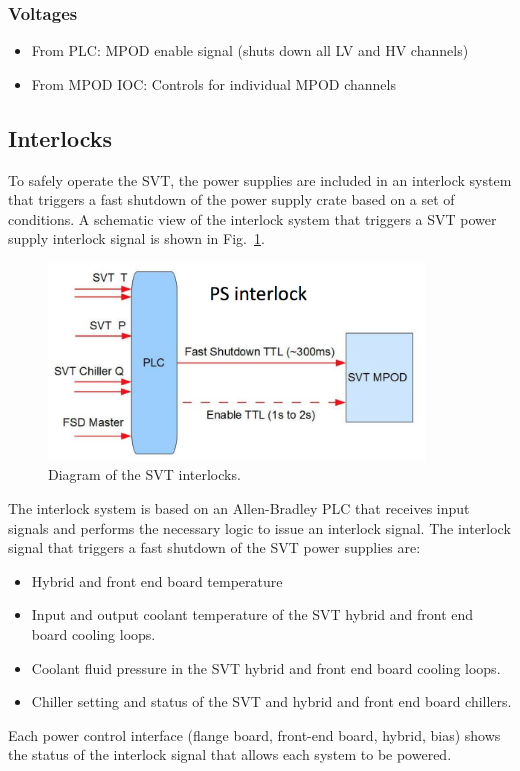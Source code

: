 \documentclass[12pt]{report}
\begin{document}
\subsubsection*{Voltages}
\begin{itemize}
    \item From PLC: MPOD enable signal (shuts down all LV and HV channels)
    \item From MPOD IOC: Controls for individual MPOD channels
\end{itemize}



\subsection{Interlocks}
\label{sec:svt_power_monitoring_alarm_interlocks}

To safely operate the SVT, the power supplies are included in an interlock system that triggers a fast shutdown of the power supply crate based on a set of conditions. A schematic view of the interlock system that triggers a SVT power supply interlock signal is shown in Fig.~\ref{fig:svt_interlock_diagram}. 
\begin{figure}
\includegraphics[width=10cm]{svt_interlock_diagram}
\caption{Diagram of the SVT interlocks.\label{fig:svt_interlock_diagram}}
\end{figure}
The interlock system is based on an Allen-Bradley PLC that receives input signals and performs the necessary logic to issue an interlock signal. The interlock signal that triggers a fast shutdown of the SVT power supplies are:
\begin{itemize}
\item Hybrid and front end board temperature
\item Input and output coolant temperature of the SVT hybrid and front end board cooling loops.
\item Coolant fluid pressure in the SVT hybrid and front end board cooling loops.
\item Chiller setting and status of the SVT and hybrid and front end board chillers.
\end{itemize}
 Each power control interface (flange board, front-end board, hybrid, bias) shows the status of the interlock signal that allows each system to be powered. 
\end{document}
